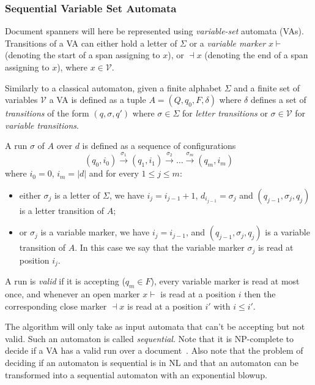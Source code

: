\documentclass[12px]{article}
\begin{document}
      \subsubsection{Sequential Variable Set Automata}

        Document spanners will here be represented using \textit{variable-set}
        automata (VAs). Transitions of a VA can either hold a letter
        of $\Sigma$ or a \textit{variable marker} $x{\vdash}$ (denoting the
        start of a span assigning to $x$), or ${\dashv}x$ (denoting the end of
        a span assigning to $x$), where $x \in \mathcal{V}$.

        Similarly to a classical automaton, given a finite alphabet $\Sigma$
        and a finite set of variables $\mathcal{V}$ a VA is defined as a tuple
        $A = (Q, q_0, F, \delta)$ where $\delta$ defines a set of
        \textit{transitions} of the form $(q, \sigma, q')$ where $\sigma \in
        \Sigma$ for \textit{letter transitions} or $\sigma \in \mathcal{V}$ for
        \textit{variable transitions}.

        A run $\sigma$ of $A$ over $d$ is defined as a sequence of
        configurations
          \[ (q_0, i_0) \xrightarrow{\sigma_1} (q_1, i_1)
          \xrightarrow{\sigma_2} \ldots \xrightarrow{\sigma_m} (q_m, i_m) \]
        where $i_0 = 0$, $i_m = |d|$ and for every $1 \leq j \leq m$:
          \begin{itemize}
            \item either $\sigma_j$ is a letter of $\Sigma$, we have $i_j =
              i_{j-1} + 1$, $d_{i_{j-1}} = \sigma_j$ and $(q_{j-1}, \sigma_j,
              q_j)$ is a letter transition of $A$;
            \item or $\sigma_j$ is a variable marker, we have $i_j = i_{j-1}$,
              and $(q_{j-1}, \sigma_j, q_j)$ is a variable transition of $A$. In
              this case we say that the variable marker $\sigma_j$ is read at
              position $i_j$.
          \end{itemize}

        A run is \textit{valid} if it is accepting ($q_m \in F$), every
        variable marker is read at most once, and whenever an open marker $x
        \vdash$ is read at a position $i$ then the corresponding close marker
        $\dashv x$ is read at a position $i'$ with $i \leq i'$.

        The algorithm will only take as input automata that can't be accepting
        but not valid. Such an automaton is called \textit{sequential}. Note
        that it is NP-complete to decide if a VA has a valid run over a
        document~\cite{freydenberger:LIPIcs:2017}. Also note that the problem
        of deciding if an automaton is sequential is in NL and that an
        automaton can be transformed into a sequential automaton with an
        exponential blowup.
\end{document}
